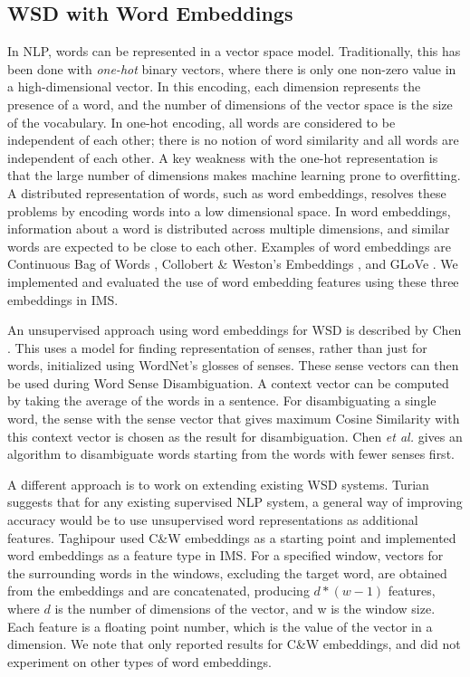 \subsection{WSD with Word Embeddings}

In NLP, words can be represented in a vector space
model. Traditionally, this has been done with {\it one-hot} binary
vectors, where there is only one non-zero value in a high-dimensional
vector. In this encoding, each dimension represents the presence of a
word, and the number of dimensions of the vector space is the size of
the vocabulary. In one-hot encoding, all words are considered to be
independent of each other; there is no notion of word similarity and
all words are independent of each other.  A key weakness with the
one-hot representation is that the large number of dimensions makes
machine learning prone to overfitting.  A distributed representation
of words, such as word embeddings, resolves these problems by encoding
words into a low dimensional space. In word embeddings, information
about a word is distributed across multiple dimensions, and similar
words are expected to be close to each other. Examples of word
embeddings are Continuous Bag of Words \cite{mikolovword2vec},
Collobert \& Weston's Embeddings \cite{collobert2008unified}, and
GLoVe \cite{pennington2014glove}. We implemented and evaluated the use
of word embedding features using these three embeddings in IMS.

An unsupervised approach using word embeddings for WSD is described by
Chen . This uses a model for finding
representation of senses, rather than just for words, initialized
using WordNet's glosses of senses. These sense vectors can then be
used during Word Sense Disambiguation. A context vector can be
computed by taking the average of the words in a sentence. For
disambiguating a single word, the sense with the sense vector that
gives maximum Cosine Similarity with this context vector is chosen as
the result for disambiguation. Chen {\it et al.} gives an algorithm to
disambiguate words starting from the words with fewer senses first.

A different approach is to work on extending existing WSD
systems. Turian  suggests that
for any existing supervised NLP system, a general way of improving
accuracy would be to use unsupervised word representations as
additional features. Taghipour  used C\&W
embeddings as a starting point and implemented word embeddings as a
feature type in IMS. For a specified window, vectors for the
surrounding words in the windows, excluding the target word, are
obtained from the embeddings and are concatenated, producing $d *
(w-1)$ features, where $d$ is the number of dimensions of the vector,
and w is the window size. Each feature is a floating point number,
which is the value of the vector in a dimension. We note that
\cite{Taghipour15} only reported results for C\&W embeddings, and did
not experiment on other types of word embeddings.

